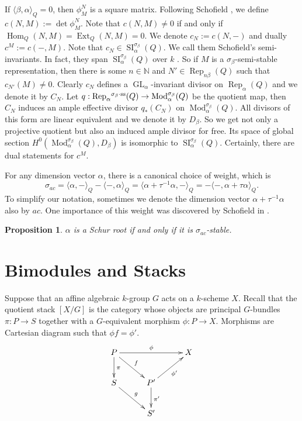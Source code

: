 \documentclass{amsart}
\newtheorem{proposition}[theorem]{Proposition}
\theoremstyle{definition}
\theoremstyle{remark}
\numberwithin{equation}{section}
\begin{document}
If ${\langle{\beta,\alpha}\rangle}_Q=0$, then $\phi_M^N$ is a square matrix. Following Schofield \cite{S1}, we define $c(N,M):=\det\phi_M^N$. Note that $c(N,M)\neq 0$ if and only if ${\operatorname{Hom}}_Q(N,M)={\operatorname{Ext}}_Q(N,M)=0$. We denote $c_N:=c(N,-)$ and dually $c^M:=c(-,M)$. Note that $c_N\in{\operatorname{SI}}_\alpha^{\sigma_\beta}(Q)$. We call them Schofield's semi-invariants. In fact, they span ${\operatorname{SI}}_\alpha^{\sigma_\beta}(Q)$ over $k$ \cite[Theorem 1]{DW1}. So if $M$ is a $\sigma_\beta$-semi-stable representation, then there is some $n\in{\mathbb{{N}}}$ and $N'\in{\operatorname{Rep}}_{n\beta}(Q)$ such that $c_{N'}(M)\neq 0$.
Clearly $c_N$ defines a ${\operatorname{GL}}_\alpha$-invariant divisor on ${\operatorname{Rep}}_\alpha(Q)$ and we denote it by $C_N$. Let $q:{\operatorname{Rep}}_\alpha{^{\sigma_{{\beta}}\cdot{\rm {ss}}}}(Q)\to{\operatorname{Mod}}_\alpha^{\sigma_\beta}(Q)$ be the quotient map, then $C_N$ induces an ample effective divisor $q_*(C_N)$ on ${\operatorname{Mod}}_\alpha^{\sigma_\beta}(Q)$. All divisors of this form are linear equivalent and we denote it by $D_\beta$. So we get not only a projective quotient but also an induced ample divisor for free. Its space of global section $H^0({\operatorname{Mod}}_\alpha^{\sigma_\beta}(Q),D_\beta)$ is isomorphic to ${\operatorname{SI}}_\alpha^{\sigma_\beta}(Q)$. Certainly, there are dual statements for $c^M$.

For any dimension vector $\alpha$, there is a canonical choice of weight, which is $$\sigma_{ac}={\langle{\alpha,-}\rangle}_Q-{\langle{-,\alpha}\rangle}_Q={\langle{\alpha+\tau^{-1}\alpha,-}\rangle}_Q=-{\langle{-,\alpha+\tau\alpha}\rangle}_Q.$$
To simplify our notation, sometimes we denote the dimension vector $\alpha+\tau^{-1}\alpha$ also by $ac$. One importance of this weight was discovered by Schofield in \cite[Theorem 6.1]{S2}.

\begin{proposition} $\alpha$ is a Schur root if and only if it is $\sigma_{ac}$-stable.
\end{proposition}

\section{Bimodules and Stacks} \label{S:bimodule}
Suppose that an affine algebraic $k$-group $G$ acts on a $k$-scheme $X$.
Recall that the quotient stack $[X/G]$ is the category whose objects are principal $G$-bundles $\pi: P\to S$ together with a $G$-equivalent morphism $\phi:P\to X$. Morphisms are Cartesian diagram
such that $\phi f=\phi'$.
$$\xymatrix @C=2.5pc {
P \ar[rr]^{\phi} \ar[d]^{\pi} \ar[dr]^{f} && X\\
S \ar[dr]^{g} & P' \ar[d]^{\pi'} \ar[ur]_{\phi'} & \\
& S'
}$$
\end{document}
